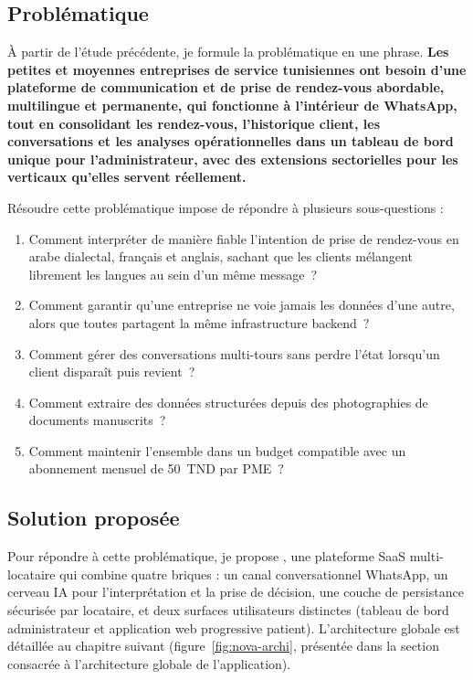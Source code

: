 \subsection{Problématique}
À partir de l'étude précédente, je formule la problématique en une
phrase. \textbf{Les petites et moyennes entreprises de service
tunisiennes ont besoin d'une plateforme de communication et de
prise de rendez-vous abordable, multilingue et permanente, qui
fonctionne à l'intérieur de WhatsApp, tout en consolidant les
rendez-vous, l'historique client, les conversations et les analyses
opérationnelles dans un tableau de bord unique pour
l'administrateur, avec des extensions sectorielles pour les
verticaux qu'elles servent réellement.}

Résoudre cette problématique impose de répondre à plusieurs
sous-questions :
\begin{enumerate}
  \item Comment interpréter de manière fiable l'intention de prise
        de rendez-vous en arabe dialectal, français et anglais,
        sachant que les clients mélangent librement les langues au
        sein d'un même message~?
  \item Comment garantir qu'une entreprise ne voie jamais les
        données d'une autre, alors que toutes partagent la même
        infrastructure backend~?
  \item Comment gérer des conversations multi-tours sans perdre
        l'état lorsqu'un client disparaît puis revient~?
  \item Comment extraire des données structurées depuis des
        photographies de documents manuscrits~?
  \item Comment maintenir l'ensemble dans un budget compatible avec
        un abonnement mensuel de 50~TND par PME~?
\end{enumerate}

\subsection{Solution proposée}
Pour répondre à cette problématique, je propose \nova, une
plateforme SaaS multi-locataire qui combine quatre briques : un
canal conversationnel WhatsApp, un cerveau IA pour l'interprétation
et la prise de décision, une couche de persistance sécurisée par
locataire, et deux surfaces utilisateurs distinctes (tableau de bord
administrateur et application web progressive patient).
L'architecture globale est détaillée au chapitre suivant
(figure~\ref{fig:nova-archi}, présentée dans la section consacrée
à l'architecture globale de l'application).

